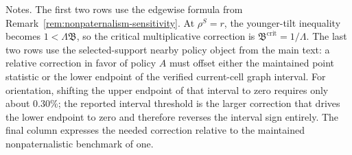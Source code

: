 \begin{table}[t]
\centering
\caption{Back-of-the-envelope behavioral thresholds for overturning the maintained benchmark}
\label{tab:behavioral-thresholds}
\footnotesize
\renewcommand{\arraystretch}{1.08}
\begin{minipage}{0.96\textwidth}
\footnotesize Notes. The first two rows use the edgewise formula from Remark~\ref{rem:nonpaternalism-sensitivity}. At $\rho^{S}=r$, the younger-tilt inequality becomes $1<\Lambda\mathfrak{B}$, so the critical multiplicative correction is $\mathfrak{B}^{\mathrm{crit}}=1/\Lambda$. The last two rows use the selected-support nearby policy object from the main text: a relative correction in favor of policy $A$ must offset either the maintained point statistic or the lower endpoint of the verified current-cell graph interval. For orientation, shifting the upper endpoint of that interval to zero requires only about $0.30$\%; the reported interval threshold is the larger correction that drives the lower endpoint to zero and therefore reverses the interval sign entirely. The final column expresses the needed correction relative to the maintained nonpaternalistic benchmark of one.
\end{minipage}
\end{table}
